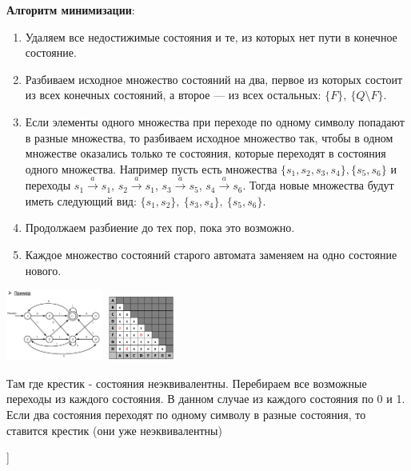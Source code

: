 \textbf{Алгоритм минимизации}:
\begin{enumerate}
    \item Удаляем все недостижимые состояния и те, из которых нет пути в конечное состояние.
    \item Разбиваем исходное множество состояний на два, первое из которых состоит из всех конечных состояний, а второе --- из всех остальных: $\{F\},~\{Q \setminus F\}$.
    \item Если элементы одного множества при переходе по одному символу попадают в разные множества, то разбиваем исходное множество так, чтобы в одном множестве оказались только те состояния, которые переходят в состояния одного множества.
    Например пусть есть множества $\{s_1,s_2,s_3,s_4\},\{s_5,s_6\}$ и переходы $s_1 \xrightarrow{a} s_1$, $s_2 \xrightarrow{a} s_1$, $s_3 \xrightarrow{a} s_5$, $s_4 \xrightarrow{a} s_6$.
    Тогда новые множества будут иметь следующий вид: $\{s_1,s_2\},~\{s_3,s_4\},~\{s_5,s_6\}$.
    \item Продолжаем разбиение до тех пор, пока это возможно.
    \item Каждое множество состояний старого автомата заменяем на одно состояние нового.
\end{enumerate}

\includegraphics[width=0.24\textwidth]{pics/equivalence1.png}
\includegraphics[width=0.17\textwidth]{pics/equivalence2.png}

Там где крестик - состояния неэквивалентны. Перебираем все возможные переходы из каждого состояния. В данном случае из каждого состояния по 0 и 1. Если два состояния переходят по одному символу в разные состояния, то ставится крестик (они уже неэквивалентны)

    


\bigbreak
[\cite[page 25-37]{ignatiev4}]